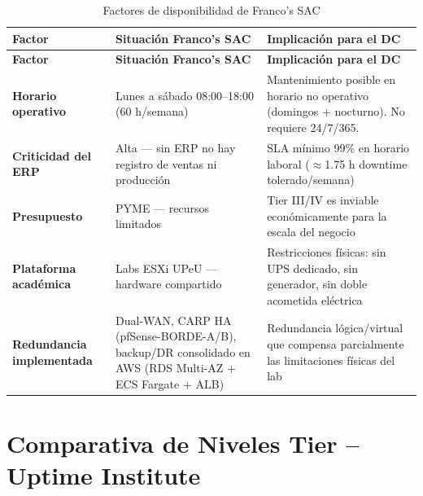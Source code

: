 \documentclass[11pt, a4paper, oneside]{report}
\begin{document}
\begin{xltabular}{\textwidth}{@{}|L{2.4cm}|L{4.4cm}|X|@{}}
\caption{Factores de disponibilidad de Franco's SAC}
\label{tab:necesidades_tier} \\

\parbox[c][1.1cm][c]{\linewidth}{\centering\color{white}\bfseries\small Factor} &
\parbox[c][1.1cm][c]{\linewidth}{\centering\color{white}\bfseries\small Situación Franco's SAC} &
\parbox[c][1.1cm][c]{\linewidth}{\centering\color{white}\bfseries\small Implicación para el DC} \\ \hline
\endfirsthead

\parbox[c][1.1cm][c]{\linewidth}{\centering\color{white}\bfseries\small Factor} &
\parbox[c][1.1cm][c]{\linewidth}{\centering\color{white}\bfseries\small Situación Franco's SAC} &
\parbox[c][1.1cm][c]{\linewidth}{\centering\color{white}\bfseries\small Implicación para el DC} \\ \hline
\endhead

\hline
\endfoot

{\small \textbf{Horario operativo}} & {\small Lunes a sábado 08:00--18:00 (60 h/semana)} & {\small Mantenimiento posible en horario no operativo (domingos + nocturno). No requiere 24/7/365.} \\ \hline
{\small \textbf{Criticidad del ERP}} & {\small Alta — sin ERP no hay registro de ventas ni producción} & {\small SLA mínimo 99\% en horario laboral ($\approx$1.75 h downtime tolerado/semana)} \\ \hline
{\small \textbf{Presupuesto}} & {\small PYME — recursos limitados} & {\small Tier III/IV es inviable económicamente para la escala del negocio} \\ \hline
{\small \textbf{Plataforma académica}} & {\small Labs ESXi UPeU — hardware compartido} & {\small Restricciones físicas: sin UPS dedicado, sin generador, sin doble acometida eléctrica} \\ \hline
{\small \textbf{Redundancia implementada}} & {\small Dual-WAN, CARP HA (pfSense-BORDE-A/B), backup/DR consolidado en AWS (RDS Multi-AZ + ECS Fargate + ALB)} & {\small Redundancia lógica/virtual que compensa parcialmente las limitaciones físicas del lab} \\ \hline

\end{xltabular}
\normalsize

\section{Comparativa de Niveles Tier -- Uptime Institute}
\end{document}
